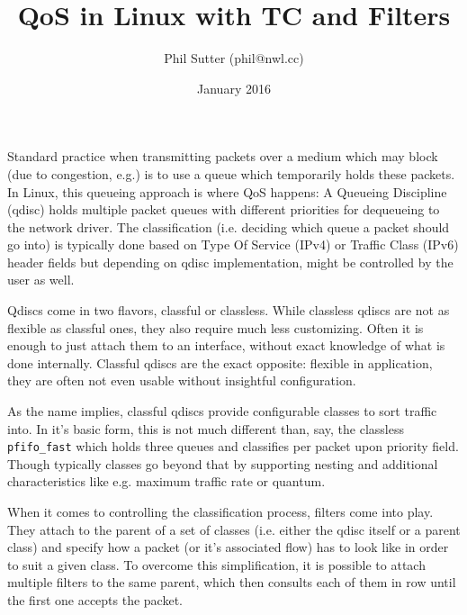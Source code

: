\documentclass[12pt,twoside]{article}
\newcommand{\qdisc}{\texttt}
\begin{document}
\title{QoS in Linux with TC and Filters}
\author{Phil Sutter (phil@nwl.cc)}
\date{January 2016}
\maketitle

Standard practice when transmitting packets over a medium which may block (due
to congestion, e.g.) is to use a queue which temporarily holds these packets. In
Linux, this queueing approach is where QoS happens: A Queueing Discipline
(qdisc) holds multiple packet queues with different priorities for dequeueing to
the network driver. The classification (i.e. deciding which queue a packet
should go into) is typically done based on Type Of Service (IPv4) or Traffic
Class (IPv6) header fields but depending on qdisc implementation, might be
controlled by the user as well.

Qdiscs come in two flavors, classful or classless. While classless qdiscs are
not as flexible as classful ones, they also require much less customizing. Often
it is enough to just attach them to an interface, without exact knowledge of
what is done internally. Classful qdiscs are the exact opposite: flexible in
application, they are often not even usable without insightful configuration.

As the name implies, classful qdiscs provide configurable classes to sort
traffic into. In it's basic form, this is not much different than, say, the
classless \qdisc{pfifo\_fast} which holds three queues and classifies per
packet upon priority field. Though typically classes go beyond that by
supporting nesting and additional characteristics like e.g. maximum traffic
rate or quantum.

When it comes to controlling the classification process, filters come into play.
They attach to the parent of a set of classes (i.e. either the qdisc itself or
a parent class) and specify how a packet (or it's associated flow) has to look
like in order to suit a given class. To overcome this simplification, it is
possible to attach multiple filters to the same parent, which then consults each
of them in row until the first one accepts the packet.
\end{document}
